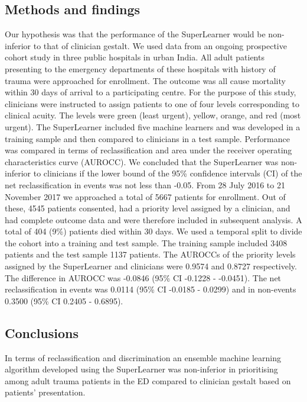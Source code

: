 \documentclass[10pt,letterpaper]{article}\usepackage[]{graphicx}\usepackage[]{color}
\begin{document}
\subsection*{Methods and findings}
Our hypothesis was that the performance of the SuperLearner would be
non-inferior to that of clinician gestalt. We used data from an ongoing
prospective cohort study in three public hospitals in urban India. All adult
patients presenting to the emergency departments of these hospitals with history
of trauma were approached for enrollment. The outcome was all cause mortality
within 30 days of arrival to a participating centre. For the purpose of this
study, clinicians were instructed to assign patients to one of four levels
corresponding to clinical acuity. The levels were green (least urgent), yellow,
orange, and red (most urgent). The SuperLearner included five machine learners
and was developed in a training sample and then compared to clinicians in a test
sample. Performance was compared in terms of reclassification and area under the
receiver operating characteristics curve (AUROCC). We concluded that the
SuperLearner was non-inferior to clinicians if the lower bound of the 95\%
confidence intervals (CI) of the net reclassification in events was not less
than -0.05. From 28 July 2016 to 21 November 2017 we approached a total of
5667 patients for enrollment. Out of these,
4545 patients consented, had a priority
level assigned by a clinician, and had complete outcome data and were therefore
included in subsequent analysis. A total of 404 (9\%)
patients died within 30 days. We used a temporal split to divide the cohort into
a training and test sample. The training sample included
3408 patients and the test sample 1137
patients. The AUROCCs of the priority levels assigned by the SuperLearner and
clinicians were 0.9574 and 0.8727
respectively. The difference in AUROCC was
-0.0846 (95\% CI -0.1228 - -0.0451). The net reclassification in events was
0.0114 (95\% CI -0.0185 - 0.0299) and in non-events 0.3500 (95\% CI 0.2405 - 0.6895).

\subsection*{Conclusions}
In terms of reclassification and discrimination an ensemble machine learning
algorithm developed using the SuperLearner was non-inferior in prioritising
among adult trauma patients in the ED compared to clinician gestalt based on
patients’ presentation.

\end{document}
